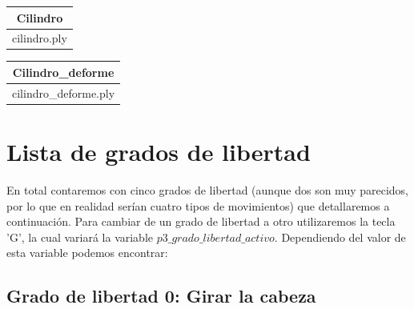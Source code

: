 \documentclass{article}
\begin{document}
\begin{table}[h!]
	\centering
	\label{11}
	\begin{tabular}{|c|}
		\hline
		\textbf{Cilindro}\\ \hline
		cilindro.ply\\ \hline
	\end{tabular}
\end{table}


\begin{table}[h!]
	\centering
	\label{12}
	\begin{tabular}{|c|}
		\hline
		\textbf{Cilindro\_deforme}\\ \hline
		cilindro\_deforme.ply\\ \hline
	\end{tabular}
\end{table}



\cleardoublepage
\section{Lista de grados de libertad}
	En total contaremos con cinco grados de libertad (aunque dos son muy parecidos, por lo que en realidad serían cuatro tipos de movimientos) que detallaremos a continuación. Para cambiar de un grado de libertad a otro utilizaremos la tecla 'G', la cual variará la variable $p3\_grado\_libertad\_activo$. Dependiendo del valor de esta variable podemos encontrar:
	 
	 
	 
	\subsection{Grado de libertad 0: Girar la cabeza}
	
\end{document}
